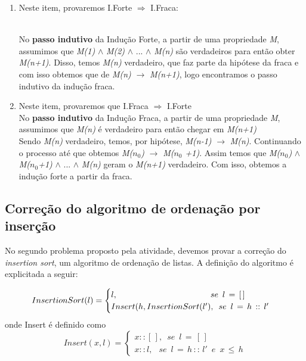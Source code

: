 \documentclass[a4paper, 10pt]{article}
\begin{document}
\begin{enumerate}
\item Neste item, provaremos I.Forte $\Rightarrow$ I.Fraca:

	\\No \textbf{passo indutivo} da Indução Forte, a partir de uma propriedade \textit{M}, assumimos que \textit{M(1)} $\wedge$ \textit{M(2)} $\wedge$ ... $\wedge$ \textit{M(n)} são verdadeiros para então obter \textit{M(n+1)}. 
    Disso, temos  \textit{M(n)} verdadeiro, que faz parte da hipótese da fraca e com isso obtemos que de \textit{M(n)} $\rightarrow$ \textit{M(n+1)}, logo encontramos o passo indutivo da indução fraca.

\item Neste item, provaremos que I.Fraca $\Rightarrow$ I.Forte 
	\\	No \textbf{passo indutivo} da Indução Fraca, a partir de uma propriedade \textit{M}, assumimos que \textit{M(n)} é verdadeiro para então chegar em \textit{M(n+1)}
    \\	Sendo \textit{M(n)} verdadeiro, temos, por hipótese, \textit{M(n-1)} $\rightarrow$ \textit{M(n)}. Continuando o processo até que obtemos \textit{M($n_0$)} $\rightarrow$ \textit{M($n_0$ +1)}. Assim temos que \textit{M($n_0$)} $\wedge$ \textit{M($n_0$+1)} $\wedge$ ... $\wedge$ \textit{M(n)} geram o \textit{M(n+1)} verdadeiro.
    Com isso, obtemos a indução forte a partir da fraca.
\end{enumerate}


\subsection{Correção do algoritmo de ordenação por inserção}
\label{sec:insertion}

No segundo problema proposto pela atividade, devemos provar a correção do \textit{insertion sort}, um algoritmo de ordenação de listas. A definição do algoritmo é explicitada a seguir:

  \begin{equation}
  \label{eq:sort}
      InsertionSort(l) =
      \begin{cases}
          l, \hspace{11.2em}			 	      se \enspace l\,=\,[\,]\\
          Insert(h, InsertionSort(l'),\enspace se \enspace l\,=\,h\,::\,l'
      \end{cases}
  \end{equation}
  onde Insert é definido como
  \begin{equation}
  \label{eq:insert}
      Insert(x,l) =
      \begin{cases}
          x::[\,],\enspace se\enspace l\,=\,[\,] \\
          x::l,\: \enspace se\enspace l\,=\,h\,::\,l'\enspace e \enspace x\, \leq \, h
      \end{cases}
  \end{equation}
\end{document}
